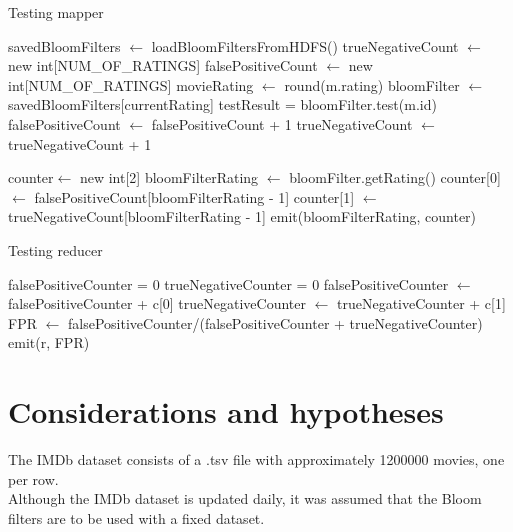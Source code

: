 \begin{algorithm}[H]
	\caption{Testing mapper} 
	\begin{algorithmic}[1]
			\State savedBloomFilters $\gets$ loadBloomFiltersFromHDFS()
			\State trueNegativeCount $\gets$ new int[NUM\_OF\_RATINGS]
        	\State falsePositiveCount $\gets$ new int[NUM\_OF\_RATINGS]
				\State movieRating $\gets$ round(m.rating)
	        		\State bloomFilter $\gets$ savedBloomFilters[currentRating]
	        		\State testResult = bloomFilter.test(m.id)
	        			\State falsePositiveCount $\gets$ falsePositiveCount + 1
	        		\EndIf
	        			\State trueNegativeCount $\gets$ trueNegativeCount + 1
	        		\EndIf
	        	\EndFor
	        \EndFor
	        
	        \State counter$\gets$ new int[2]
	        	\State bloomFilterRating $\gets$ bloomFilter.getRating()
				\State counter[0] $\gets$ falsePositiveCount[bloomFilterRating - 1]
				\State counter[1] $\gets$ trueNegativeCount[bloomFilterRating - 1]
				\State emit(bloomFilterRating, counter)
	        \EndFor
		\EndProcedure
	\end{algorithmic} 
\end{algorithm}

\begin{algorithm}[H]
	\caption{Testing reducer} 
	\begin{algorithmic}[1]
		\State falsePositiveCounter = 0
		\State trueNegativeCounter = 0
				\State falsePositiveCounter $\gets$ falsePositiveCounter  + c[0]
				\State trueNegativeCounter $\gets$ trueNegativeCounter + c[1]
			\EndIf
		\EndFor
			\State FPR $\gets$ falsePositiveCounter/(falsePositiveCounter + trueNegativeCounter)
			\State emit(r, FPR)
		\EndIf
		\EndProcedure
	\end{algorithmic} 
\end{algorithm}

\section{Considerations and hypotheses}
The IMDb dataset consists of a .tsv file with approximately 1200000 movies, one per row.\\
Although the IMDb dataset is updated daily, it was assumed that the Bloom filters are to be used with a fixed dataset. 
